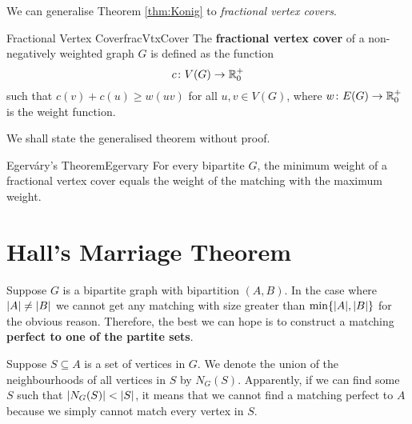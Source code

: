 \documentclass[math, code]{amznotes}
\theoremstyle{remark}
\begin{document}
We can generalise Theorem \ref{thm:Konig} to \textit{fractional vertex covers}.
\begin{dfnbox}{Fractional Vertex Cover}{fracVtxCover}
    The {\color{red} \textbf{fractional vertex cover}} of a non-negatively weighted graph $G$ is defined as the function
    \begin{equation*}
        c \colon V(G) \to \mathbb{R}^+_0
    \end{equation*}
    such that $c(v) + c(u) \geq w(uv)$ for all $u, v \in V(G)$, where $w \colon E(G) \to \mathbb{R}^+_0$ is the weight function.
\end{dfnbox}
We shall state the generalised theorem without proof.
\begin{thmbox}{Egerv\'{a}ry's Theorem}{Egervary}
    For every bipartite $G$, the minimum weight of a fractional vertex cover equals the weight of the matching with the maximum weight.
\end{thmbox}
\section{Hall's Marriage Theorem}
Suppose $G$ is a bipartite graph with bipartition $(A, B)$. In the case where ${\left\lvert {A} \right\rvert} \neq {\left\lvert {B} \right\rvert}$ we cannot get any matching with size greater than $\min\{{\left\lvert {A} \right\rvert}, {\left\lvert {B} \right\rvert}\}$ for the obvious reason. Therefore, the best we can hope is to construct a matching \textbf{perfect to one of the partite sets}.

Suppose $S \subseteq A$ is a set of vertices in $G$. We denote the union of the neighbourhoods of all vertices in $S$ by $N_G(S)$. Apparently, if we can find some $S$ such that ${\left\lvert {N_G(S)} \right\rvert} < {\left\lvert {S} \right\rvert}$, it means that we cannot find a matching perfect to $A$ because we simply cannot match every vertex in $S$.
\end{document}
